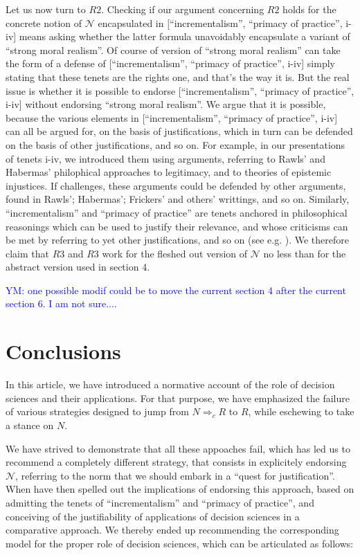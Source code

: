 \documentclass[preprint, french, english, 11pt, authoryear]{elsarticle}%
\newcommand{\commentYM}[1]{\textcolor{blue}{YM: #1}}
\newcommand{\adv}{\mathscr{N}}
\begin{document}
Let us now turn to $R2$. Checking if our argument concerning $R2$ holds for the concrete notion of $\adv$ encapsulated in [``incrementalism'', ``primacy of practice'', i-iv] means asking whether the latter formula unavoidably encapsulate a variant of ``strong moral realism''. Of course of version of ``strong moral realism'' can take the form of a defense of [``incrementalism'', ``primacy of practice'', i-iv] simply stating that these tenets are the rights one, and that's the way it is. But the real issue is whether it is possible to endorse [``incrementalism'', ``primacy of practice'', i-iv] without endorsing ``strong moral realism''. We argue that it is possible, because the various elements in [``incrementalism'', ``primacy of practice'', i-iv] can all be argued for, on the basis of justifications, which in turn can be defended on the basis of other justifications, and so on. For example, in our presentations of tenets i-iv, we introduced them using arguments, referring to Rawls' and Habermas' philophical approaches to legitimacy, and to theories of epistemic injustices. If challenges, these arguments could be defended by other arguments, found in Rawls'; Habermas'; Frickers' and others' writtings, and so on. Similarly, ``incrementalism'' and ``primacy of practice'' are tenets anchored in philosophical reasonings which can be used to justify their relevance, and whose criticisms can be met by referring to yet other justifications, and so on (see e.g. \citet{meinard_du_2013}). We therefore claim that $R3$ and $R3$ work for the fleshed out version of $\adv$ no less than for the abstract version used in section 4.

\commentYM{one possible modif could be to move the current section 4 after the current section 6. I am not sure....}

\section{Conclusions}
In this article, we have introduced a normative account of the role of decision sciences and their applications. For that purpose, we have emphasized the failure of various strategies designed  to jump from $N ⇒_c R$ to $R$, while eschewing to take a stance on $N$.

We have strived to demonstrate that all these appoaches fail, which has led us to recommend a completely different strategy, that consists in explicitely endorsing $\adv$, referring to the norm that we should embark in a ``quest for justification''. When have then spelled out the implications of endorsing this approach, based on admitting the tenets of ``incrementalism'' and ``primacy of practice'', and conceiving of the justifiability of applications of decision sciences in a comparative approach. We thereby ended up recommending the corresponding model for the proper role of decision sciences, which can be articulated as follows:
\end{document}
